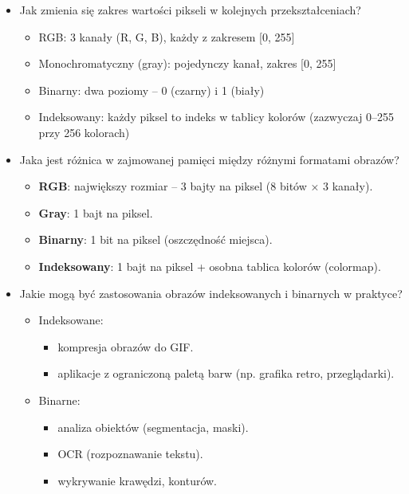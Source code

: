 \begin{itemize}
	\item Jak zmienia się zakres wartości pikseli w kolejnych przekształceniach?
	
	\begin{itemize}
		\item RGB: 3 kanały (R, G, B), każdy z zakresem [0, 255]
		\item Monochromatyczny (gray): pojedynczy kanał, zakres [0, 255]
		\item Binarny: dwa poziomy – 0 (czarny) i 1 (biały)
		\item Indeksowany: każdy piksel to indeks w tablicy kolorów (zazwyczaj 0–255 przy 256 kolorach)
	\end{itemize}

	\item Jaka jest różnica w zajmowanej pamięci między różnymi formatami obrazów?

	\begin{itemize}
		\item \textbf{RGB}: największy rozmiar – 3 bajty na piksel (8 bitów × 3 kanały).
		\item \textbf{Gray}: 1 bajt na piksel.
		\item \textbf{Binarny}: 1 bit na piksel (oszczędność miejsca).
		\item \textbf{Indeksowany}: 1 bajt na piksel + osobna tablica kolorów (colormap).
	\end{itemize}

	\item Jakie mogą być zastosowania obrazów indeksowanych i binarnych w praktyce?

	\begin{itemize}
		\item Indeksowane:
		
		\begin{itemize}
			\item kompresja obrazów do GIF.
			\item aplikacje z ograniczoną paletą barw (np. grafika retro, przeglądarki).
		\end{itemize}
		
		\item Binarne:
		
		\begin{itemize}
			\item analiza obiektów (segmentacja, maski).
			\item OCR (rozpoznawanie tekstu).
			\item wykrywanie krawędzi, konturów.
		\end{itemize}
	\end{itemize}

\end{itemize}

